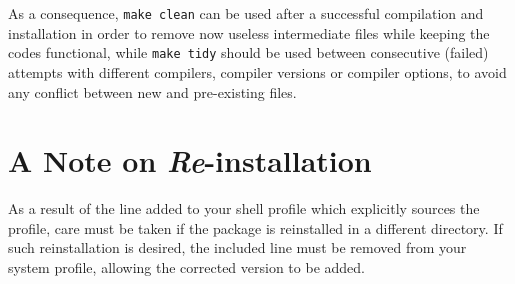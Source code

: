 \documentclass[12pt,twoside]{article}
\begin{document}
As a consequence, \texttt{make clean} can be used after a successful compilation and installation in order to remove now useless intermediate files while keeping the codes functional, 
while
\texttt{make tidy} should be used between consecutive (failed) attempts with different compilers, compiler versions or compiler options, to avoid any conflict between new and pre-existing files.





\section{A Note on {\it Re}-installation}

As a result of the line added to your shell profile which explicitly
sources the \healpix profile, care must be taken if the package 
is reinstalled in a different directory. If such reinstallation
is desired, the included line must be removed from your system profile,
allowing the corrected version to be added.  
\end{document}
